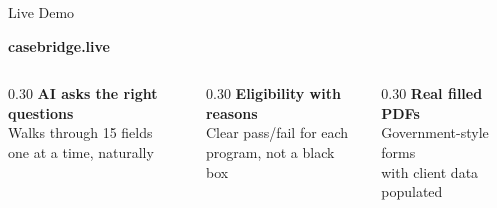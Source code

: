 \documentclass[aspectratio=169,11pt]{beamer}
\newcommand{\pill}[1]{%
  \tikz[baseline=(t.base)]{\node[fill=brand!10,text=brand,rounded corners=3pt,inner sep=3pt,font=\footnotesize\bfseries](t){#1};}%
}
\begin{document}
\begin{frame}{Live Demo}
\vspace{6pt}
\begin{center}
  {\color{brand}\Large\bfseries casebridge.live}
\end{center}
\vspace{8pt}
\begin{center}
\end{center}
\vspace{10pt}
\begin{columns}[T]
  \begin{column}{0.30\textwidth}
    \centering
    {\small\textbf{AI asks the right questions}}\\[3pt]
    {\color{muted}\scriptsize Walks through 15 fields\\one at a time, naturally}
  \end{column}
  \begin{column}{0.30\textwidth}
    \centering
    {\small\textbf{Eligibility with reasons}}\\[3pt]
    {\color{muted}\scriptsize Clear pass/fail for each\\program, not a black box}
  \end{column}
  \begin{column}{0.30\textwidth}
    \centering
    {\small\textbf{Real filled PDFs}}\\[3pt]
    {\color{muted}\scriptsize Government-style forms\\with client data populated}
  \end{column}
\end{columns}
\end{frame}
\end{document}
